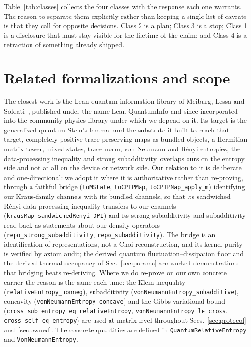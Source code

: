 \documentclass[aps,pra,reprint,nofootinbib,superscriptaddress]{revtex4-2}
\theoremstyle{plain}
\theoremstyle{definition}
\theoremstyle{remark}
\newcommand{\lean}[1]{\texttt{#1}}
\begin{document}
Table~\ref{tab:classes} collects the four classes with the response each
one warrants. The reason to separate them explicitly rather than keeping
a single list of caveats is that they call for opposite decisions. Class
2 is a plan; Class 3 is a stop; Class 1 is a disclosure that must stay
visible for the lifetime of the claim; and Class 4 is a retraction of
something already shipped.

\begin{table}
\caption{Where a certification chain breaks, and what each class warrants.
The classes call for opposite responses, which is why a single list of
caveats is not a substitute for separating them.}
\label{tab:classes}
\begin{ruledtabular}
\footnotesize

\end{ruledtabular}
\end{table}

\section{Related formalizations and scope}
\label{sec:related}

The closest work is the Lean quantum-information library of Meiburg,
Lessa and Soldati~\cite{Meiburg2025PhysLib}, published under the name
Lean-QuantumInfo and since incorporated into the community physics
library under which we depend on it. Its target is the generalized
quantum Stein's lemma, and the substrate it built to reach that target,
completely-positive trace-preserving maps as bundled objects, a Hermitian
matrix tower, mixed states, trace norm, von Neumann and R\'enyi
entropies, the data-processing inequality and strong subadditivity,
overlaps ours on the entropy side and not at all on the device or network
side. Our relation to it is deliberate and one-directional: we adopt it
where it is authoritative rather than re-proving, through a faithful
bridge (\lean{toMState}, \lean{toCPTPMap}, \lean{toCPTPMap\_apply\_m})
identifying our Kraus-family channels with its bundled channels, so that
its sandwiched R\'enyi data-processing inequality transfers to our
channels (\lean{krausMap\_sandwichedRenyi\_DPI}) and its strong
subadditivity and subadditivity read back as statements about our density
operators (\lean{repo\_strong\_subadditivity},
\lean{repo\_subadditivity}). The bridge is an identification of
representations, not a Choi reconstruction, and its kernel purity is
verified by axiom audit; the derived quantum fluctuation--dissipation
floor and the derived thermal occupancy of Sec.~\ref{sec:params} are
worked demonstrations that bridging beats re-deriving. Where we do
re-prove on our own concrete carrier the reason is the same each time:
the Klein inequality (\lean{relativeEntropy\_nonneg}), subadditivity
(\lean{vonNeumannEntropy\_subadditive}), concavity
(\lean{vonNeumannEntropy\_concave}) and the Gibbs variational bound
(\lean{cross\_sub\_entropy\_eq\_relativeEntropy},
\lean{vonNeumannEntropy\_le\_cross}, \lean{cross\_self\_eq\_entropy})
are used at matrix level throughout Secs.~\ref{sec:protocol}
and~\ref{sec:owned}. The concrete quantities are defined in
\lean{QuantumRelativeEntropy} and \lean{VonNeumannEntropy}.
\end{document}
